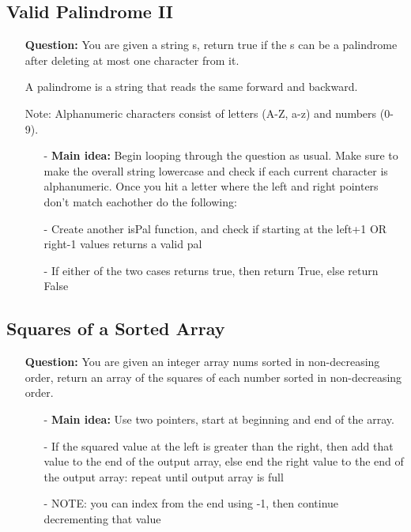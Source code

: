 \documentclass[12pt]{article}
\begin{document}
\subsection{Valid Palindrome II}
\begin{enumerate}
  \item[] \textbf{Question:} You are given a string s, return true if the s can be a palindrome after deleting at most one character from it.

A palindrome is a string that reads the same forward and backward.

Note: Alphanumeric characters consist of letters (A-Z, a-z) and numbers (0-9).


    \begin{enumerate}
      \item[-] \textbf{Main idea: } Begin looping through the question as usual. Make sure to make the overall string lowercase and check if each current character is  alphanumeric. Once you hit a letter where the left and right pointers don't match eachother do the following: 
      \item[-] Create another isPal function, and check if starting at the left+1 OR right-1 values returns a valid pal
      \item[-] If either of the two cases returns true, then return True, else return False

    \end{enumerate}
\end{enumerate}


\subsection{Squares of a Sorted Array}
\begin{enumerate}
  \item[] \textbf{Question:} You are given an integer array nums sorted in non-decreasing order, return an array of the squares of each number sorted in non-decreasing order.


    \begin{enumerate}
      \item[-] \textbf{Main idea: } Use two pointers, start at beginning and end of the array.
      \item[-] If the squared value at the left is greater than the right, then add that value to the end of the output array, else end the right value to the end of the output array: repeat until output array is full 
      \item[-] NOTE: you can index from the end using -1, then continue decrementing that value

    \end{enumerate}
\end{enumerate}
\end{document}
